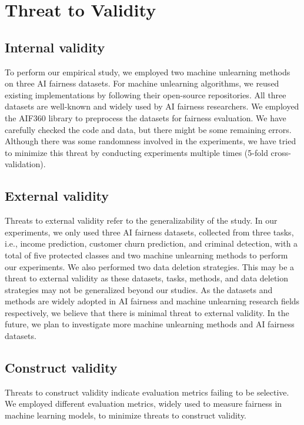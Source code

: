 \section{Threat to Validity}
\label{sec:threat}
\subsection{Internal validity}
To perform our empirical study, we employed two machine unlearning methods on three AI fairness datasets. For machine unlearning algorithms, we reused existing implementations by following their open-source repositories. All three datasets are well-known and widely used by AI fairness researchers. We employed the AIF360 library to preprocess the datasets for fairness evaluation. We have carefully checked the code and data, but there might be some remaining errors. Although there was some randomness involved in the experiments, we have tried to minimize this threat by conducting experiments multiple times (5-fold cross-validation).

\subsection{External validity}
Threats to external validity refer to the generalizability of the study. In our experiments, we only used three AI fairness datasets, collected from three tasks, i.e., income prediction, customer churn prediction, and criminal detection, with a total of five protected classes and two machine unlearning methods to perform our experiments. We also performed two data deletion strategies. 
This may be a threat to external validity as these datasets, tasks, methods, and data deletion strategies may not be generalized beyond our studies. As the datasets and methods are widely adopted in AI fairness and machine unlearning research fields respectively, we believe that there is minimal threat to external validity. In the future, we plan to
investigate more machine unlearning methods and AI fairness datasets.

\subsection{Construct validity}
Threats to construct validity indicate evaluation metrics failing to be selective. We employed different evaluation metrics, widely used to measure fairness in machine learning models, to minimize threats to construct validity. 
